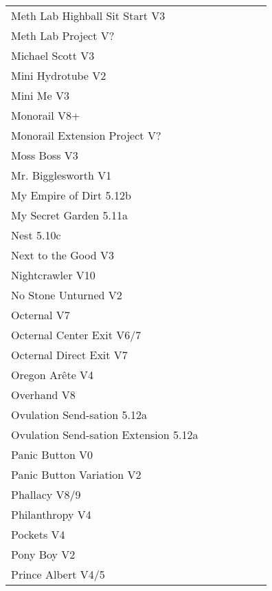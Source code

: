 \begin{flushleft}
\begin{center}
\begin{supertabular}{p{0.76\linewidth}p{0.08\linewidth}}
Meth Lab Highball Sit Start V3 & \pageref{vr:Meth Lab Highball Sit Start} \\
Meth Lab Project V? & \pageref{rt:Meth Lab Project} \\
Michael Scott V3 & \pageref{rt:Michael Scott} \\
Mini Hydrotube V2 & \pageref{rt:Mini Hydrotube} \\
Mini Me V3 & \pageref{rt:Mini Me} \\
Monorail V8+ & \pageref{rt:Monorail} \\
Monorail Extension Project V? & \pageref{vr:Monorail Extension Project} \\
Moss Boss V3 & \pageref{rt:Moss Boss} \\
Mr. Bigglesworth V1 & \pageref{vr:Mr. Bigglesworth} \\
My Empire of Dirt 5.12b & \pageref{rt:My Empire of Dirt} \\
My Secret Garden 5.11a & \pageref{rt:My Secret Garden} \\
Nest 5.10c & \pageref{rt:Nest} \\
Next to the Good V3 & \pageref{rt:Next to the Good} \\
Nightcrawler V10 & \pageref{rt:Nightcrawler} \\
No Stone Unturned V2 & \pageref{rt:No Stone Unturned} \\
Octernal V7 & \pageref{rt:Octernal} \\
Octernal Center Exit V6/7 & \pageref{vr:Octernal Center Exit} \\
Octernal Direct Exit V7 & \pageref{vr:Octernal Direct Exit} \\
Oregon Arête V4 & \pageref{rt:Oregon Arête} \\
Overhand V8 & \pageref{rt:Overhand} \\
Ovulation Send-sation 5.12a & \pageref{rt:Ovulation Send-sation} \\
Ovulation Send-sation Extension 5.12a & \pageref{vr:Ovulation Send-sation Extension} \\
Panic Button V0 & \pageref{rt:Panic Button} \\
Panic Button Variation V2 & \pageref{vr:Panic Button Variation} \\
Phallacy V8/9 & \pageref{rt:Phallacy} \\
Philanthropy V4 & \pageref{rt:Philanthropy} \\
Pockets V4 & \pageref{rt:Pockets} \\
Pony Boy V2 & \pageref{rt:Pony Boy} \\
Prince Albert V4/5 & \pageref{rt:Prince Albert} \\

\end{supertabular}
\end{center}
\end{flushleft}
